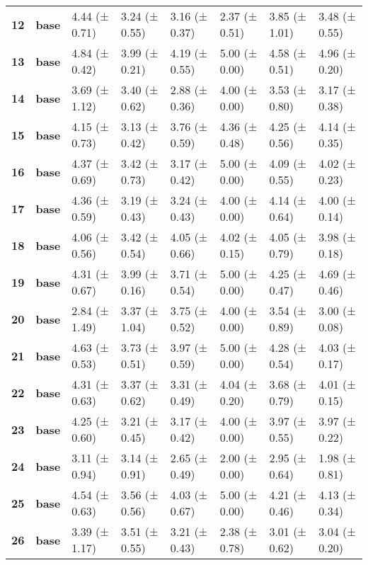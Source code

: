 \begin{longtable}{llllllll}
\cline{1-8}
\textbf{12} & \textbf{base} & 4.44 (± 0.71) & 3.24 (± 0.55) & 3.16 (± 0.37) & 2.37 (± 0.51) & 3.85 (± 1.01) & 3.48 (± 0.55) \\
\cline{1-8}
\textbf{13} & \textbf{base} & 4.84 (± 0.42) & 3.99 (± 0.21) & 4.19 (± 0.55) & 5.00 (± 0.00) & 4.58 (± 0.51) & 4.96 (± 0.20) \\
\cline{1-8}
\textbf{14} & \textbf{base} & 3.69 (± 1.12) & 3.40 (± 0.62) & 2.88 (± 0.36) & 4.00 (± 0.00) & 3.53 (± 0.80) & 3.17 (± 0.38) \\
\cline{1-8}
\textbf{15} & \textbf{base} & 4.15 (± 0.73) & 3.13 (± 0.42) & 3.76 (± 0.59) & 4.36 (± 0.48) & 4.25 (± 0.56) & 4.14 (± 0.35) \\
\cline{1-8}
\textbf{16} & \textbf{base} & 4.37 (± 0.69) & 3.42 (± 0.73) & 3.17 (± 0.42) & 5.00 (± 0.00) & 4.09 (± 0.55) & 4.02 (± 0.23) \\
\cline{1-8}
\textbf{17} & \textbf{base} & 4.36 (± 0.59) & 3.19 (± 0.43) & 3.24 (± 0.43) & 4.00 (± 0.00) & 4.14 (± 0.64) & 4.00 (± 0.14) \\
\cline{1-8}
\textbf{18} & \textbf{base} & 4.06 (± 0.56) & 3.42 (± 0.54) & 4.05 (± 0.66) & 4.02 (± 0.15) & 4.05 (± 0.79) & 3.98 (± 0.18) \\
\cline{1-8}
\textbf{19} & \textbf{base} & 4.31 (± 0.67) & 3.99 (± 0.16) & 3.71 (± 0.54) & 5.00 (± 0.00) & 4.25 (± 0.47) & 4.69 (± 0.46) \\
\cline{1-8}
\textbf{20} & \textbf{base} & 2.84 (± 1.49) & 3.37 (± 1.04) & 3.75 (± 0.52) & 4.00 (± 0.00) & 3.54 (± 0.89) & 3.00 (± 0.08) \\
\cline{1-8}
\textbf{21} & \textbf{base} & 4.63 (± 0.53) & 3.73 (± 0.51) & 3.97 (± 0.59) & 5.00 (± 0.00) & 4.28 (± 0.54) & 4.03 (± 0.17) \\
\cline{1-8}
\textbf{22} & \textbf{base} & 4.31 (± 0.63) & 3.37 (± 0.62) & 3.31 (± 0.49) & 4.04 (± 0.20) & 3.68 (± 0.79) & 4.01 (± 0.15) \\
\cline{1-8}
\textbf{23} & \textbf{base} & 4.25 (± 0.60) & 3.21 (± 0.45) & 3.17 (± 0.42) & 4.00 (± 0.00) & 3.97 (± 0.55) & 3.97 (± 0.22) \\
\cline{1-8}
\textbf{24} & \textbf{base} & 3.11 (± 0.94) & 3.14 (± 0.91) & 2.65 (± 0.49) & 2.00 (± 0.00) & 2.95 (± 0.64) & 1.98 (± 0.81) \\
\cline{1-8}
\textbf{25} & \textbf{base} & 4.54 (± 0.63) & 3.56 (± 0.56) & 4.03 (± 0.67) & 5.00 (± 0.00) & 4.21 (± 0.46) & 4.13 (± 0.34) \\
\cline{1-8}
\textbf{26} & \textbf{base} & 3.39 (± 1.17) & 3.51 (± 0.55) & 3.21 (± 0.43) & 2.38 (± 0.78) & 3.01 (± 0.62) & 3.04 (± 0.20) \\

\end{longtable}
